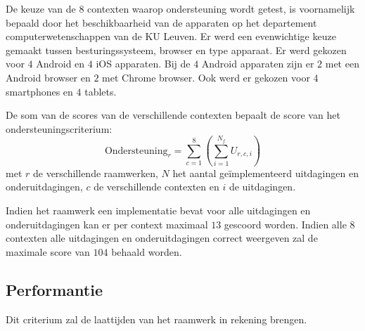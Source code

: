  \begin{table}[H]
 \centering
 \resizebox{14cm}{!} {
 }
 \caption{Beschikbare apparaten met hun besturingssysteem~(BS) en browser.}
 \label{tabel:toestellen-hci}
 \end{table}
 
De keuze van de $8$ contexten waarop ondersteuning wordt getest, is voornamelijk bepaald door het beschikbaarheid van de apparaten op het departement computerwetenschappen van de KU Leuven.
Er werd een evenwichtige keuze gemaakt tussen besturingssysteem,  browser en type apparaat.
Er werd gekozen voor $4$ Android en $4$ iOS apparaten.
Bij de $4$ Android apparaten zijn er $2$ met een Android browser en $2$ met Chrome browser.
Ook werd er gekozen voor $4$ smartphones en $4$ tablets.

De som van de scores van de verschillende contexten bepaalt de score van het ondersteuningscriterium:
\begin{equation}
  \text{Ondersteuning}_r = \sum_{c=1}^{8}{\left(\sum_{i=1}^{N_f}U_{r,c,i}\right)}
  \label{eq:ondersteuning}
\end{equation}
met $r$ de verschillende raamwerken,  $N$ het aantal geïmplementeerd uitdagingen en onderuitdagingen,  $c$ de verschillende contexten en $i$ de uitdagingen. 


Indien het raamwerk een implementatie bevat voor alle uitdagingen en onderuitdagingen kan er per context maximaal $13$ gescoord worden.
Indien alle $8$ contexten alle uitdagingen en onderuitdagingen correct weergeven zal de maximale score van $104$ behaald worden.


\subsection{Performantie}
\label{sec:vergelijking-performantie}
Dit criterium zal de laattijden van het raamwerk in rekening brengen.

